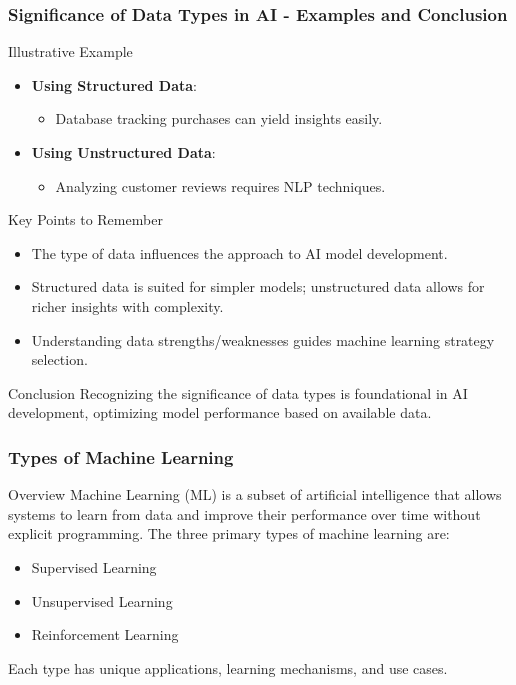 \documentclass[aspectratio=169]{beamer}
\begin{document}
\begin{frame}[fragile]
    \frametitle{Significance of Data Types in AI - Examples and Conclusion}
    \begin{block}{Illustrative Example}
        \begin{itemize}
            \item \textbf{Using Structured Data}:
                \begin{itemize}
                    \item Database tracking purchases can yield insights easily.
                \end{itemize}
            \item \textbf{Using Unstructured Data}:
                \begin{itemize}
                    \item Analyzing customer reviews requires NLP techniques.
                \end{itemize}
        \end{itemize}
    \end{block}

    \begin{block}{Key Points to Remember}
        \begin{itemize}
            \item The type of data influences the approach to AI model development.
            \item Structured data is suited for simpler models; unstructured data allows for richer insights with complexity.
            \item Understanding data strengths/weaknesses guides machine learning strategy selection.
        \end{itemize}
    \end{block}

    \begin{block}{Conclusion}
        Recognizing the significance of data types is foundational in AI development, optimizing model performance based on available data.
    \end{block}
\end{frame}

\begin{frame}[fragile]
    \frametitle{Types of Machine Learning}
    \begin{block}{Overview}
        Machine Learning (ML) is a subset of artificial intelligence that allows systems to learn from data and improve their performance over time without explicit programming. The three primary types of machine learning are:
        \begin{itemize}
            \item Supervised Learning
            \item Unsupervised Learning
            \item Reinforcement Learning
        \end{itemize}
        Each type has unique applications, learning mechanisms, and use cases.
    \end{block}
\end{frame}
\end{document}
